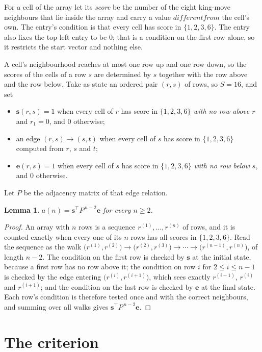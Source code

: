 \documentclass[11pt,a4paper]{article}
\theoremstyle{plain}
\newtheorem{lemma}[theorem]{Lemma}
\theoremstyle{definition}
\begin{document}
For a cell of the array let its \emph{score} be the number of the eight king-move neighbours that lie inside
the array and carry a value $different from$ the cell's own. The entry's condition is that every cell
has score in $\{1,2,3,6\}$. The entry also fixes the top-left entry to be $0$; that is a condition on the first row alone, so it restricts the start vector and nothing else.

A cell's neighbourhood reaches at most one row up and one row down, so the scores of the
cells of a row $s$ are determined by $s$ together with the row above and the row below.
Take as state an ordered pair $(r,s)$ of rows, so $S=16$, and set
\begin{itemize}
\item $\mathbf{s}(r,s)=1$ when every cell of $r$ has score in $\{1,2,3,6\}$ \emph{with no row
above $r$} and $r_1=0$, and $0$ otherwise;
\item an edge $(r,s)\to(s,t)$ when every cell of $s$ has score in $\{1,2,3,6\}$ computed from
$r$, $s$ and $t$;
\item $\mathbf{e}(r,s)=1$ when every cell of $s$ has score in $\{1,2,3,6\}$ \emph{with no row
below $s$}, and $0$ otherwise.
\end{itemize}
Let $P$ be the adjacency matrix of that edge relation.

\begin{lemma}\label{lem:walk}
$a(n)=\mathbf{s}^{\!\top}P^{\,n-2}\mathbf{e}$ for every $n\ge2$.
\end{lemma}

\begin{proof}
An array with $n$ rows is a sequence $r^{(1)},\dots,r^{(n)}$ of rows, and it is counted
exactly when every one of its $n$ rows has all scores in $\{1,2,3,6\}$. Read the sequence as the
walk $\bigl(r^{(1)},r^{(2)}\bigr)\to\bigl(r^{(2)},r^{(3)}\bigr)\to\cdots\to
\bigl(r^{(n-1)},r^{(n)}\bigr)$, of length $n-2$. The condition on the first row is
checked by $\mathbf{s}$ at the initial state, because a first row has no row above it; the
condition on row $i$ for $2\le i\le n-1$ is checked by the edge entering
$\bigl(r^{(i)},r^{(i+1)}\bigr)$, which sees exactly $r^{(i-1)}$, $r^{(i)}$ and
$r^{(i+1)}$; and the condition on the last row is checked by $\mathbf{e}$ at the final
state. Each row's condition is therefore tested once and with the correct neighbours, and
summing over all walks gives $\mathbf{s}^{\!\top}P^{\,n-2}\mathbf{e}$.
\end{proof}

\section{The criterion}
\end{document}
